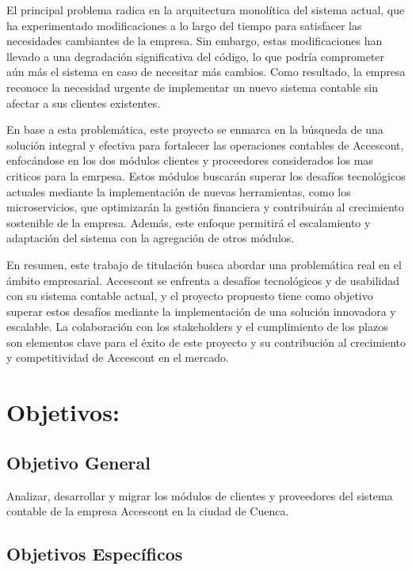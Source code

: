 \documentclass{article}
\begin{document}
 El principal problema radica en la arquitectura monolítica del sistema actual, que ha experimentado modificaciones a lo largo del tiempo para satisfacer las necesidades cambiantes de la empresa. Sin embargo, estas modificaciones han llevado a una degradación significativa del código, lo que podría comprometer aún más el sistema en caso de necesitar más cambios. Como resultado, la empresa reconoce la necesidad urgente de implementar un nuevo sistema contable sin afectar a sus clientes existentes.
 
 En base a esta problemática, este proyecto se enmarca en la búsqueda de una solución integral y efectiva para fortalecer las operaciones contables de Accescont, enfocándose en los dos módulos clientes y proceedores considerados los mas criticos para la emrpesa. Estos módulos buscarán superar los desafíos tecnológicos actuales mediante la implementación de nuevas herramientas, como los microservicios, que optimizarán la gestión financiera y contribuirán al crecimiento sostenible de la empresa. Además, este enfoque permitirá el escalamiento y adaptación del sistema con la agregación de otros módulos.
  
 En resumen, este trabajo de titulación busca abordar una problemática real en el ámbito empresarial. Accescont se enfrenta a desafíos tecnológicos y de usabilidad con su sistema contable actual, y el proyecto propuesto tiene como objetivo superar estos desafíos mediante la implementación de una solución innovadora y escalable. La colaboración con los stakeholders y el cumplimiento de los plazos son elementos clave para el éxito de este proyecto y su contribución al crecimiento y competitividad de Accescont en el mercado.
 

\section{Objetivos:}

\subsection{Objetivo General}

Analizar, desarrollar y migrar los módulos de clientes y proveedores del sistema contable de la empresa Accescont en la ciudad de Cuenca.  
\subsection{Objetivos Específicos}
\end{document}
